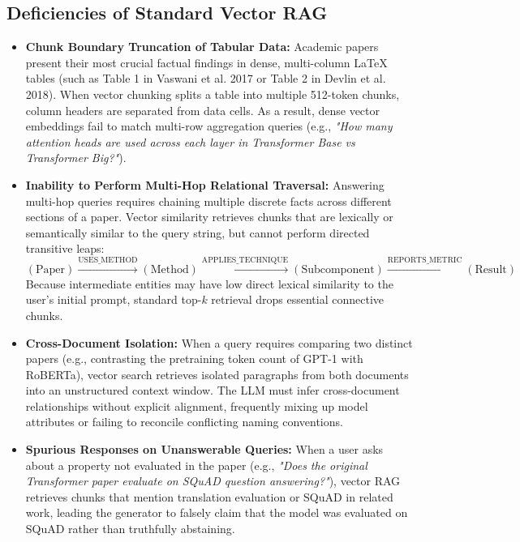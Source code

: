 \documentclass[12pt,a4paper,oneside]{report}
\begin{document}
\subsection{Deficiencies of Standard Vector RAG}
\begin{itemize}
    \item \textbf{Chunk Boundary Truncation of Tabular Data:} Academic papers present their most crucial factual findings in dense, multi-column LaTeX tables (such as Table 1 in Vaswani et al. 2017 or Table 2 in Devlin et al. 2018). When vector chunking splits a table into multiple 512-token chunks, column headers are separated from data cells. As a result, dense vector embeddings fail to match multi-row aggregation queries (e.g., \textit{"How many attention heads are used across each layer in Transformer Base vs Transformer Big?"}).
    \item \textbf{Inability to Perform Multi-Hop Relational Traversal:} Answering multi-hop queries requires chaining multiple discrete facts across different sections of a paper. Vector similarity retrieves chunks that are lexically or semantically similar to the query string, but cannot perform directed transitive leaps:
    \begin{equation}
        (\text{Paper}) \xrightarrow{\text{USES\_METHOD}} (\text{Method}) \xrightarrow{\text{APPLIES\_TECHNIQUE}} (\text{Subcomponent}) \xrightarrow{\text{REPORTS\_METRIC}} (\text{Result})
    \end{equation}
    Because intermediate entities may have low direct lexical similarity to the user's initial prompt, standard top-$k$ retrieval drops essential connective chunks.
    \item \textbf{Cross-Document Isolation:} When a query requires comparing two distinct papers (e.g., contrasting the pretraining token count of GPT-1 with RoBERTa), vector search retrieves isolated paragraphs from both documents into an unstructured context window. The LLM must infer cross-document relationships without explicit alignment, frequently mixing up model attributes or failing to reconcile conflicting naming conventions.
    \item \textbf{Spurious Responses on Unanswerable Queries:} When a user asks about a property not evaluated in the paper (e.g., \textit{"Does the original Transformer paper evaluate on SQuAD question answering?"}), vector RAG retrieves chunks that mention translation evaluation or SQuAD in related work, leading the generator to falsely claim that the model was evaluated on SQuAD rather than truthfully abstaining.
\end{itemize}
\end{document}
